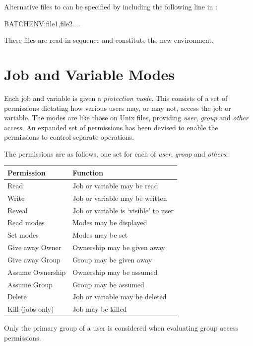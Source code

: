 Alternative files to \batchenv{} can be specified by including the following line in \linebreak[20]\masterconfig:

\begin{expara}

BATCHENV:file1,file2....

\end{expara}

These files are read in sequence and constitute the new environment.

\section{Job and Variable Modes}
Each job and variable is given a \textit{protection mode}. This consists of a set of permissions dictating how various users may, or may not,
access the job or variable. The modes are like those on Unix files, providing \textit{user}, \textit{group} and \textit{other} access. An
expanded set of permissions has been devised to enable the permissions to control separate operations.

The permissions are as follows, one set for each of \textit{user}, \textit{group} and \textit{others}:

\begin{center}
\begin{tabular}{|l l|}
\hline
\bfseries Permission &
\bfseries Function\\\hline
Read & Job or variable may be read\\
Write & Job or variable may be written\\
Reveal & Job or variable is `visible' to user\\
Read modes & Modes may be displayed\\
Set modes & Modes may be set\\
Give away Owner & Ownership may be given away\\
Give away Group & Group may be given away\\
Assume Ownership & Ownership may be assumed\\
Assume Group & Group may be assumed\\
Delete & Job or variable may be deleted\\
Kill (jobs only) & Job may be killed\\\hline
\end{tabular}
\end{center}
Only the primary group of a user is considered when evaluating group access permissions.

